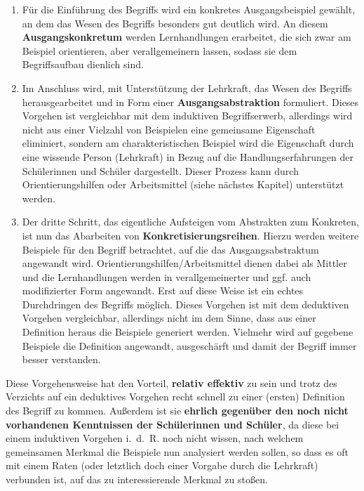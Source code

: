 \documentclass[
]{scrbook}
\theoremstyle{definition}
\theoremstyle{definition}
\theoremstyle{definition}
\theoremstyle{definition}
\theoremstyle{remark}
\begin{document}
\begin{enumerate}
\def\labelenumi{\arabic{enumi}.}
\item
  Für die Einführung des Begriffs wird ein konkretes Ausgangsbeispiel gewählt, an dem das Wesen des Begriffs besonders gut deutlich wird. An diesem \textbf{Ausgangskonkretum} werden Lernhandlungen erarbeitet, die sich zwar am Beispiel orientieren, aber verallgemeinern lassen, sodass sie dem Begriffsaufbau dienlich sind.
\item
  Im Anschluss wird, mit Unterstützung der Lehrkraft, das Wesen des Begriffs herausgearbeitet und in Form einer \textbf{Ausgangsabstraktion} formuliert. Dieses Vorgehen ist vergleichbar mit dem induktiven Begriffserwerb, allerdings wird nicht aus einer Vielzahl von Beispielen eine gemeinsame Eigenschaft eliminiert, sondern am charakteristischen Beispiel wird die Eigenschaft durch eine wissende Person (Lehrkraft) in Bezug auf die Handlungserfahrungen der Schülerinnen und Schüler dargestellt. Dieser Prozess kann durch Orientierungshilfen oder Arbeitsmittel (siehe nächstes Kapitel) unterstützt werden.
\item
  Der dritte Schritt, das eigentliche Aufsteigen vom Abstrakten zum Konkreten, ist nun das Abarbeiten von \textbf{Konkretisierungsreihen}. Hierzu werden weitere Beispiele für den Begriff betrachtet, auf die das Ausgangsabstraktum angewandt wird. Orientierungshilfen/Arbeitsmittel dienen dabei als Mittler und die Lernhandlungen werden in verallgemeinerter und ggf. auch modifizierter Form angewandt. Erst auf diese Weise ist ein echtes Durchdringen des Begriffs möglich. Dieses Vorgehen ist mit dem deduktiven Vorgehen vergleichbar, allerdings nicht im dem Sinne, dass aus einer Definition heraus die Beispiele generiert werden. Vielmehr wird auf gegebene Beispiele die Definition angewandt, ausgeschärft und damit der Begriff immer besser verstanden.
\end{enumerate}

Diese Vorgehensweise hat den Vorteil, \textbf{relativ effektiv} zu sein und trotz des Verzichts auf ein deduktives Vorgehen recht schnell zu einer (ersten) Definition des Begriff zu kommen. Außerdem ist sie \textbf{ehrlich gegenüber den noch nicht vorhandenen Kenntnissen der Schülerinnen und Schüler}, da diese bei einem induktiven Vorgehen i.~d.~R. noch nicht wissen, nach welchem gemeinsamen Merkmal die Beispiele nun analysiert werden sollen, so dass es oft mit einem Raten (oder letztlich doch einer Vorgabe durch die Lehrkraft) verbunden ist, auf das zu interessierende Merkmal zu stoßen.
\end{document}
